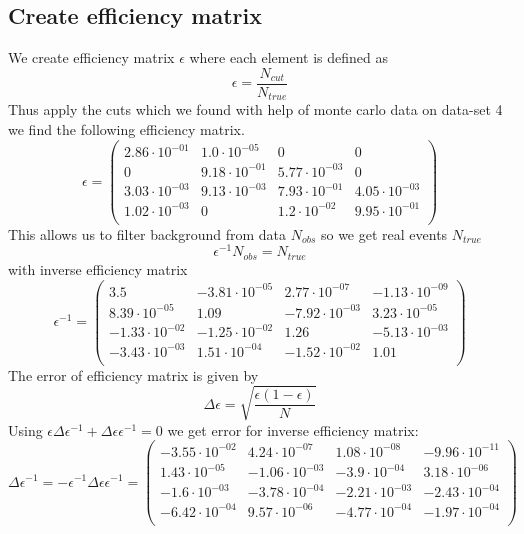 \documentclass[]{article}
\begin{document}
\subsection{Create efficiency matrix}
We create efficiency matrix $\epsilon$ where each element is defined as 
\begin{equation}
\epsilon = \frac{N_{cut}}{N_{true}}
\end{equation}
Thus apply the cuts which we found with help of monte carlo data on data-set 4 we find the following efficiency matrix.
\begin{equation}
\epsilon=\begin{pmatrix}
   2.86\cdot 10^{-01} & 1.0\cdot 10^{-05} & 0 & 0 \\
   0 & 9.18\cdot 10^{-01} & 5.77\cdot 10^{-03} & 0 \\
   3.03\cdot 10^{-03} & 9.13\cdot 10^{-03} & 7.93\cdot 10^{-01} & 4.05\cdot 10^{-03} \\
   1.02\cdot 10^{-03} & 0 & 1.2\cdot 10^{-02} & 9.95\cdot 10^{-01} \\
\end{pmatrix}
\end{equation}
This allows us to filter background from data $N_{obs}$ so we get real events $N_{true}$
\begin{equation}
\epsilon^{-1} N_{obs} = N_{true}
\end{equation}
with inverse efficiency matrix
\begin{equation}
\epsilon^{-1}=\begin{pmatrix}
   3.5 & -3.81\cdot 10^{-05} & 2.77\cdot 10^{-07} & -1.13\cdot 10^{-09} \\
   8.39\cdot 10^{-05} & 1.09 & -7.92\cdot 10^{-03} & 3.23\cdot 10^{-05} \\
   -1.33\cdot 10^{-02} & -1.25\cdot 10^{-02} & 1.26 & -5.13\cdot 10^{-03} \\
   -3.43\cdot 10^{-03} & 1.51\cdot 10^{-04} & -1.52\cdot 10^{-02} & 1.01 \\
\end{pmatrix}
\label{eq:eff-inv}
\end{equation}
The error of efficiency matrix is given by
\begin{equation}
\Delta \epsilon = \sqrt{\frac{\epsilon(1-\epsilon)}{N}}
\end{equation}
Using $\epsilon\Delta\epsilon^{-1}+\Delta\epsilon\epsilon^{-1}=0$ we get error for inverse efficiency matrix:
\begin{equation}
\Delta\epsilon^{-1} = -\epsilon^{-1}\Delta\epsilon\epsilon^{-1} = \begin{pmatrix}
   -3.55 \cdot 10^{-02} & 4.24 \cdot 10^{-07} & 1.08 \cdot 10^{-08} & -9.96 \cdot 10^{-11} \\
   1.43 \cdot 10^{-05} & -1.06 \cdot 10^{-03} & -3.9 \cdot 10^{-04} & 3.18 \cdot 10^{-06} \\
   -1.6 \cdot 10^{-03} & -3.78 \cdot 10^{-04} & -2.21 \cdot 10^{-03} & -2.43 \cdot 10^{-04} \\
   -6.42 \cdot 10^{-04} & 9.57 \cdot 10^{-06} & -4.77 \cdot 10^{-04} & -1.97 \cdot 10^{-04} \\
\end{pmatrix}
\end{equation}
\end{document}
